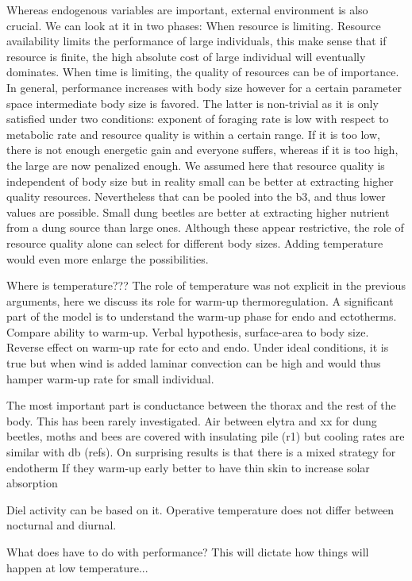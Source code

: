Whereas endogenous variables are important, external environment is also crucial.
We can look at it in two phases:
When resource is limiting.
Resource availability limits the performance of large individuals, this make sense that if resource is finite, the high absolute cost of large individual will eventually dominates.
When time is limiting, the quality of resources can be of importance.
In general, performance increases with body size however for a certain parameter space intermediate body size is favored.
The latter is non-trivial as it is only satisfied under two conditions: exponent of foraging rate is low with respect to metabolic rate and resource quality is within a certain range.
If it is too low, there is not enough energetic gain and everyone suffers, whereas if it is too high, the large are now penalized enough.
We assumed here that resource quality is  independent of body size but in reality small can be better at extracting higher quality resources.
Nevertheless that can be pooled into the b3, and thus lower values are possible.
Small dung beetles are better at extracting higher nutrient from a dung source than large ones.
Although these appear restrictive, the role of resource quality alone can select for different body sizes.
Adding temperature would even more enlarge the possibilities.

Where is temperature???
The role of temperature was not explicit in the previous arguments, here we discuss its role for warm-up thermoregulation.
A significant part of the model is to understand the warm-up phase for endo and ectotherms. 
Compare ability to warm-up.
Verbal hypothesis, surface-area to body size. 
Reverse effect on warm-up rate for ecto and endo.
Under ideal conditions, it is true but when wind is added laminar convection can be high and would thus hamper warm-up rate for small individual. 

The most important part is conductance between the thorax and the rest of the body. 
This has been rarely investigated.
Air between elytra and xx for dung beetles, moths and bees are covered with insulating pile (r1) but cooling rates are similar with db (refs).
On surprising results is that there is a mixed strategy for endotherm
If they warm-up early better to have thin skin to increase solar absorption

Diel activity can be based on it. 
Operative temperature does not differ between nocturnal and diurnal.

What does have to do with performance?
This will dictate how things will happen at low temperature...

